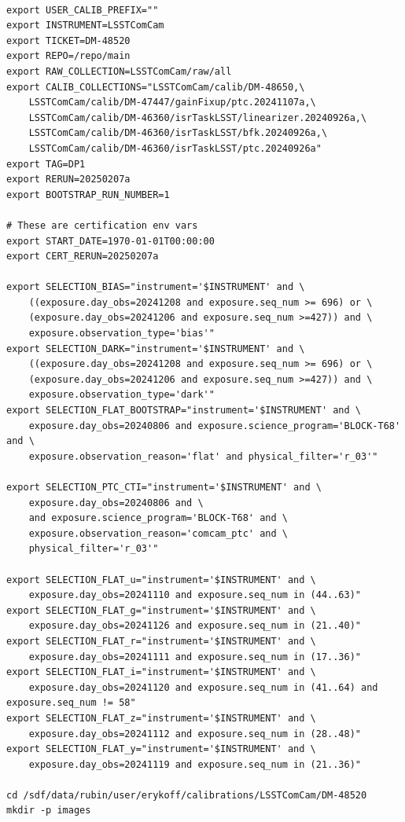 \documentclass[DM,authoryear,toc]{lsstdoc}
\begin{document}
\begin{verbatim}

export USER_CALIB_PREFIX=""
export INSTRUMENT=LSSTComCam
export TICKET=DM-48520
export REPO=/repo/main
export RAW_COLLECTION=LSSTComCam/raw/all
export CALIB_COLLECTIONS="LSSTComCam/calib/DM-48650,\
    LSSTComCam/calib/DM-47447/gainFixup/ptc.20241107a,\
    LSSTComCam/calib/DM-46360/isrTaskLSST/linearizer.20240926a,\
    LSSTComCam/calib/DM-46360/isrTaskLSST/bfk.20240926a,\
    LSSTComCam/calib/DM-46360/isrTaskLSST/ptc.20240926a"
export TAG=DP1
export RERUN=20250207a
export BOOTSTRAP_RUN_NUMBER=1

# These are certification env vars
export START_DATE=1970-01-01T00:00:00
export CERT_RERUN=20250207a

export SELECTION_BIAS="instrument='$INSTRUMENT' and \
    ((exposure.day_obs=20241208 and exposure.seq_num >= 696) or \
    (exposure.day_obs=20241206 and exposure.seq_num >=427)) and \
    exposure.observation_type='bias'"
export SELECTION_DARK="instrument='$INSTRUMENT' and \
    ((exposure.day_obs=20241208 and exposure.seq_num >= 696) or \
    (exposure.day_obs=20241206 and exposure.seq_num >=427)) and \
    exposure.observation_type='dark'"
export SELECTION_FLAT_BOOTSTRAP="instrument='$INSTRUMENT' and \
    exposure.day_obs=20240806 and exposure.science_program='BLOCK-T68' and \
    exposure.observation_reason='flat' and physical_filter='r_03'"

export SELECTION_PTC_CTI="instrument='$INSTRUMENT' and \
    exposure.day_obs=20240806 and \
    and exposure.science_program='BLOCK-T68' and \
    exposure.observation_reason='comcam_ptc' and \
    physical_filter='r_03'"

export SELECTION_FLAT_u="instrument='$INSTRUMENT' and \
    exposure.day_obs=20241110 and exposure.seq_num in (44..63)"
export SELECTION_FLAT_g="instrument='$INSTRUMENT' and \
    exposure.day_obs=20241126 and exposure.seq_num in (21..40)"
export SELECTION_FLAT_r="instrument='$INSTRUMENT' and \
    exposure.day_obs=20241111 and exposure.seq_num in (17..36)"
export SELECTION_FLAT_i="instrument='$INSTRUMENT' and \
    exposure.day_obs=20241120 and exposure.seq_num in (41..64) and exposure.seq_num != 58"
export SELECTION_FLAT_z="instrument='$INSTRUMENT' and \
    exposure.day_obs=20241112 and exposure.seq_num in (28..48)"
export SELECTION_FLAT_y="instrument='$INSTRUMENT' and \
    exposure.day_obs=20241119 and exposure.seq_num in (21..36)"

cd /sdf/data/rubin/user/erykoff/calibrations/LSSTComCam/DM-48520
mkdir -p images


\end{verbatim}
\end{document}
